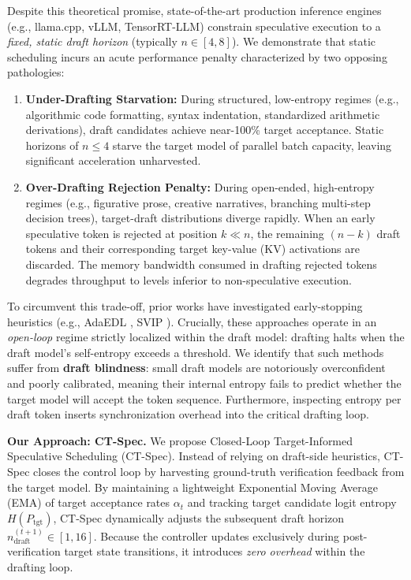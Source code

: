 \documentclass[journal,10pt,twocolumn]{IEEEtran}
\newcommand{\code}[1]{{\ttfamily\small #1}}
\newcommand{\ctspec}{\mbox{CT-Spec}}
\begin{document}
Despite this theoretical promise, state-of-the-art production inference engines (e.g., \code{llama.cpp}, \code{vLLM}, TensorRT-LLM) constrain speculative execution to a \textit{fixed, static draft horizon} (typically $n \in [4, 8]$). We demonstrate that static scheduling incurs an acute performance penalty characterized by two opposing pathologies:
\begin{enumerate}
    \item \textbf{Under-Drafting Starvation:} During structured, low-entropy regimes (e.g., algorithmic code formatting, syntax indentation, standardized arithmetic derivations), draft candidates achieve near-100\% target acceptance. Static horizons of $n \le 4$ starve the target model of parallel batch capacity, leaving significant acceleration unharvested.
    \item \textbf{Over-Drafting Rejection Penalty:} During open-ended, high-entropy regimes (e.g., figurative prose, creative narratives, branching multi-step decision trees), target-draft distributions diverge rapidly. When an early speculative token is rejected at position $k \ll n$, the remaining $(n - k)$ draft tokens and their corresponding target key-value (KV) activations are discarded. The memory bandwidth consumed in drafting rejected tokens degrades throughput to levels inferior to non-speculative execution.
\end{enumerate}

To circumvent this trade-off, prior works have investigated early-stopping heuristics (e.g., AdaEDL \cite{adaedl2024}, SVIP \cite{svip2024}). Crucially, these approaches operate in an \textit{open-loop} regime strictly localized within the draft model: drafting halts when the draft model's self-entropy exceeds a threshold. We identify that such methods suffer from \textbf{draft blindness}: small draft models are notoriously overconfident and poorly calibrated, meaning their internal entropy fails to predict whether the target model will accept the token sequence. Furthermore, inspecting entropy per draft token inserts synchronization overhead into the critical drafting loop.

\textbf{Our Approach: \ctspec{}.} We propose Closed-Loop Target-Informed Speculative Scheduling (\ctspec{}). Instead of relying on draft-side heuristics, \ctspec{} closes the control loop by harvesting ground-truth verification feedback from the target model. By maintaining a lightweight Exponential Moving Average (EMA) of target acceptance rates $\alpha_t$ and tracking target candidate logit entropy $H(P_{\mathrm{tgt}})$, \ctspec{} dynamically adjusts the subsequent draft horizon $n_{\mathrm{draft}}^{(t+1)} \in [1, 16]$. Because the controller updates exclusively during post-verification target state transitions, it introduces \textit{zero overhead} within the drafting loop.
\end{document}
